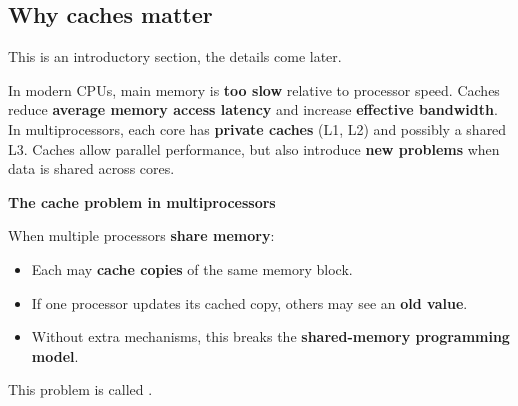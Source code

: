 \subsection{Why caches matter}

This is an introductory section, the details come later.

\highspace
In modern CPUs, main memory is \textbf{too slow} relative to processor speed. Caches reduce \textbf{average memory access latency} and increase \textbf{effective bandwidth}. In multiprocessors, each core has \textbf{private caches} (L1, L2) and possibly a shared L3. Caches allow parallel performance, but also introduce \textbf{new problems} when data is shared across cores.

\highspace
\begin{flushleft}
    \textcolor{Red2}{ \textbf{The cache problem in multiprocessors}}
\end{flushleft}
When multiple processors \textbf{share memory}:
\begin{itemize}
    \item Each may \textbf{cache copies} of the same memory block.
    \item If one processor updates its cached copy, others may see an \textbf{old value}.
    \item Without extra mechanisms, this breaks the \textbf{shared-memory programming model}.
\end{itemize}
This problem is called .

